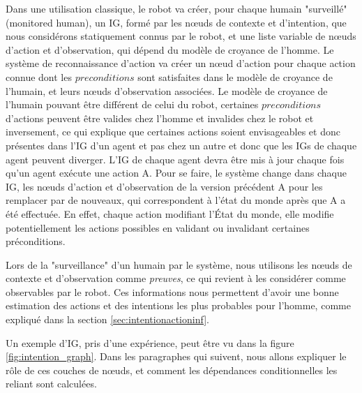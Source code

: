 \documentclass[a4paper,11pt,twoside]{StyleThese}
\begin{document}
Dans une utilisation classique, le robot va créer, pour chaque humain "surveillé" (monitored human), un IG, formé par les nœuds de contexte et d'intention, que nous considérons statiquement connus par le robot, et une liste variable de nœuds d'action et d'observation, qui dépend du modèle de croyance de l'homme. Le système de reconnaissance d'action va créer un nœud d'action pour chaque action connue dont les  $preconditions$ sont satisfaites dans le modèle de croyance de l'humain, et leurs nœuds d'observation associées. Le modèle de croyance de l'humain pouvant être différent de celui du robot, certaines $preconditions$ d'actions peuvent être valides chez l'homme et invalides chez le robot et inversement, ce qui explique que certaines actions soient envisageables et donc présentes dans l'IG d'un agent et pas chez un autre et donc que les IGs de chaque agent peuvent diverger. L'IG de chaque agent devra être mis à jour chaque fois qu'un agent exécute une action A. Pour se faire, le système change dans chaque IG, les nœuds d'action et d'observation de la version précédent A pour les remplacer par de nouveaux, qui correspondent à l'état du monde après que A a été effectuée. En effet, chaque action modifiant l'État du monde, elle modifie potentiellement les actions possibles en validant ou invalidant certaines préconditions.


Lors de la "surveillance" d'un humain par le système, nous utilisons les nœuds de contexte et d'observation comme \textit{preuves}, ce qui revient à les considérer comme observables par le robot. Ces informations nous permettent d'avoir une bonne estimation des actions et des intentions les plus probables pour l'homme, comme expliqué dans la section \ref{sec:intentionactioninf}.

Un exemple d'IG, pris d'une expérience, peut être vu dans la figure \ref{fig:intention_graph}. Dans les paragraphes qui suivent, nous allons expliquer le rôle de ces couches de nœuds, et comment les dépendances conditionnelles les reliant sont calculées.
\end{document}
